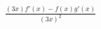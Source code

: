 \documentclass[preview]{standalone}
\begin{document}
\begin{align*}
\frac{(3x)f'(x)-f(x)g'(x)}{(3x)^2}
\end{align*}
\end{document}
